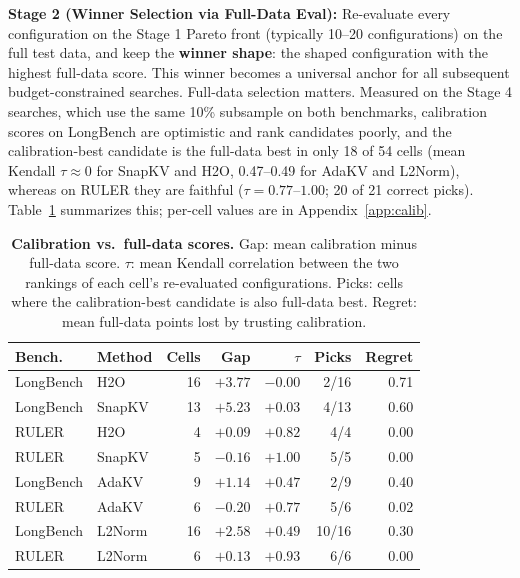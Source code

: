 \documentclass[11pt]{article}
\begin{document}
\textbf{Stage 2 (Winner Selection via Full-Data Eval):} Re-evaluate every configuration on the Stage 1 Pareto front (typically 10--20 configurations) on the full test data, and keep the \textbf{winner shape}: the shaped configuration with the highest full-data score. This winner becomes a universal anchor for all subsequent budget-constrained searches. Full-data selection matters. Measured on the Stage 4 searches, which use the same 10\% subsample on both benchmarks, calibration scores on LongBench are optimistic and rank candidates poorly, and the calibration-best candidate is the full-data best in only 18 of 54 cells (mean Kendall $\tau \approx 0$ for SnapKV and H2O, 0.47--0.49 for AdaKV and L2Norm), whereas on RULER they are faithful ($\tau = 0.77$--$1.00$; 20 of 21 correct picks). Table~\ref{tab:calib} summarizes this; per-cell values are in Appendix~\ref{app:calib}.

\begin{table}[htbp]
  \centering
  \footnotesize
  \setlength{\tabcolsep}{2.5pt}
  \begin{tabular}{@{} l l r r r r r @{}}
    \toprule
    \textbf{Bench.} & \textbf{Method} & \textbf{Cells} & \textbf{Gap} & \textbf{$\tau$} & \textbf{Picks} & \textbf{Regret} \\
    \midrule
    \rowcolor{gray!10}
    LongBench & H2O    & 16 & $+3.77$ & $-0.00$ & 2/16 & 0.71 \\
    LongBench & SnapKV & 13 & $+5.23$ & $+0.03$ & 4/13 & 0.60 \\
    \rowcolor{gray!10}
    RULER     & H2O    & 4  & $+0.09$ & $+0.82$ & 4/4  & 0.00 \\
    RULER     & SnapKV & 5  & $-0.16$ & $+1.00$ & 5/5  & 0.00 \\
    \midrule
    \rowcolor{gray!10}
    LongBench & AdaKV & 9 & $+1.14$ & $+0.47$ & 2/9 & 0.40 \\
    RULER     & AdaKV  & 6  & $-0.20$ & $+0.77$ & 5/6  & 0.02 \\
    \midrule
    \rowcolor{gray!10}
    LongBench & L2Norm & 16 & $+2.58$ & $+0.49$ & 10/16 & 0.30 \\
    RULER     & L2Norm & 6  & $+0.13$ & $+0.93$ & 6/6   & 0.00 \\
    \bottomrule
  \end{tabular}
  \caption{\textbf{Calibration vs.\ full-data scores.} Gap: mean calibration minus full-data score. $\tau$: mean Kendall correlation between the two rankings of each cell's re-evaluated configurations. Picks: cells where the calibration-best candidate is also full-data best. Regret: mean full-data points lost by trusting calibration.}
  \label{tab:calib}
\end{table}
\end{document}
